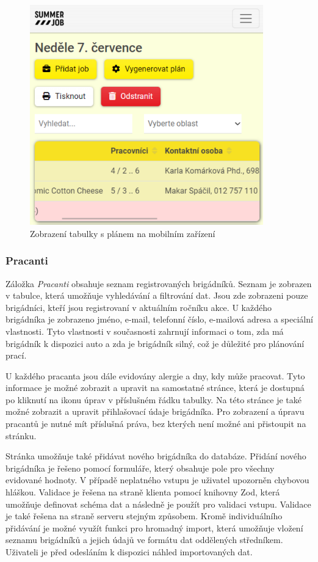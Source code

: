 \begin{figure}[ht]
    \centering
    \includegraphics[width=0.9\textwidth]{chapters/images/plan-mobile.pdf}
    \caption{Zobrazení tabulky s plánem na mobilním zařízení}
    \label{fig:plan-mobile}
\end{figure}


\subsubsection{Pracanti}

Záložka \textit{Pracanti} obsahuje seznam registrovaných brigádníků. Seznam je zobrazen v tabulce, která umožňuje vyhledávání a filtrování dat.
Jsou zde zobrazeni pouze brigádníci, kteří jsou registrovaní v aktuálním ročníku akce. U každého brigádníka je zobrazeno jméno, e-mail, telefonní číslo,
e-mailová adresa a speciální vlastnosti. Tyto vlastnosti v současnosti zahrnují informaci o tom, zda má brigádník k dispozici auto a zda je brigádník silný,
což je důležité pro plánování prací.

U každého pracanta jsou dále evidovány alergie a dny, kdy může pracovat. Tyto informace je možné zobrazit a upravit na samostatné stránce, která je dostupná
po kliknutí na ikonu úprav v příslušném řádku tabulky. Na této stránce je také možné zobrazit a upravit přihlašovací údaje brigádníka. Pro zobrazení a úpravu
pracantů je nutné mít příslušná práva, bez kterých není možné ani přistoupit na stránku.

Stránka umožňuje také přidávat nového brigádníka do databáze. Přidání nového brigádníka je řešeno pomocí formuláře, který obsahuje pole pro všechny evidované
hodnoty. V případě neplatného vstupu je uživatel upozorněn chybovou hláškou. Validace je řešena na straně klienta pomocí knihovny Zod, která umožňuje definovat
schéma dat a následně je použít pro validaci vstupu. Validace je také řešena na straně serveru stejným způsobem. Kromě individuálního přidávání je možné využít
funkci pro hromadný import, která umožňuje vložení seznamu brigádníků a jejich údajů ve formátu dat oddělených středníkem. Uživateli je před odesláním
k dispozici náhled importovaných dat.

